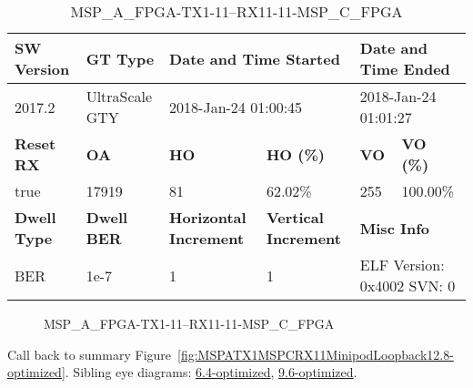 \begin{table}[h]
\centering
\caption{MSP\_A\_FPGA-TX1-11--RX11-11-MSP\_C\_FPGA}
\label{tab:MSPAFPGATX111RX1111MSPCFPGA12.8-optimized}
\begin{tabular}{@{}|l|l|l|l|l|l|@{}}
\toprule
\textbf{SW Version}                & \textbf{GT Type}   & \multicolumn{2}{l|}{\textbf{Date and Time Started}}            & \multicolumn{2}{l|}{\textbf{Date and Time Ended}}        \\ \midrule
2017.2                       & UltraScale GTY          & \multicolumn{2}{l|}{2018-Jan-24 01:00:45}                   & \multicolumn{2}{l|}{2018-Jan-24 01:01:27}               \\ \midrule
\textbf{Reset RX}                  & \textbf{OA} & \textbf{HO}   & \textbf{HO (\%)} & \textbf{VO} & \textbf{VO (\%)} \\ \midrule
true & 17919        & 81          & 62.02\%        & 255        & 100.00\%       \\ \midrule
\textbf{Dwell Type}                & \textbf{Dwell BER} & \textbf{Horizontal Increment} & \textbf{Vertical Increment}    & \multicolumn{2}{l|}{\textbf{Misc Info}}                  \\ \midrule
BER                            & 1e-7        & 1        & 1           & \multicolumn{2}{l|}{ELF Version: 0x4002 SVN: 0}                         \\ \bottomrule
\end{tabular}
\end{table}

\begin{figure}[h]
\caption{MSP\_A\_FPGA-TX1-11--RX11-11-MSP\_C\_FPGA} \label{fig:MSPAFPGATX111RX1111MSPCFPGA12.8-optimized}
\end{figure}

Call back to summary Figure~\ref{fig:MSPATX1MSPCRX11MinipodLoopback12.8-optimized}.
Sibling eye diagrams: \hyperref[sec:MSPAFPGATX111RX1111MSPCFPGA6.4-optimized]{6.4-optimized}, \hyperref[sec:MSPAFPGATX111RX1111MSPCFPGA9.6-optimized]{9.6-optimized}.

\clearpage
\newpage

